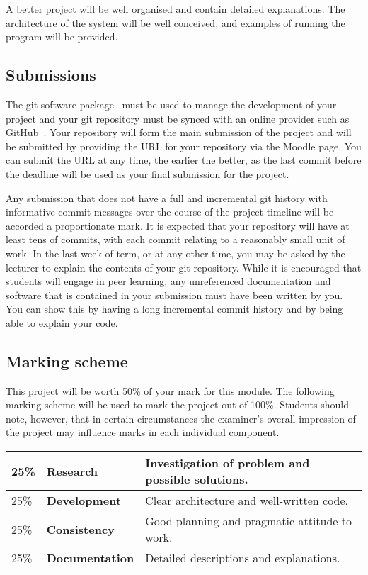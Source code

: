 \documentclass[12pt, a4paper]{article}
\begin{document}
A better project will be well organised and contain detailed explanations.
The architecture of the system will be well conceived, and examples of running the program will be provided.


\subsection*{Submissions}
The git software package~\cite{git} must be used to manage the development of your project and your git repository must be synced with an online provider such as GitHub~\cite{github}.
Your repository will form the main submission of the project and will be submitted by providing the URL for your repository via the Moodle page.
You can submit the URL at any time, the earlier the better, as the last commit before the deadline will be used as your final submission for the project.

Any submission that does not have a full and incremental git history with informative commit messages over the course of the project timeline will be accorded a proportionate mark.
It is expected that your repository will have at least tens of commits, with each commit relating to a reasonably small unit of work.
In the last week of term, or at any other time, you may be asked by the lecturer to explain the contents of your git repository.
While it is encouraged that students will engage in peer learning, any unreferenced documentation and software that is contained in your submission must have been written by you.
You can show this by having a long incremental commit history and by being able to explain your code.

\subsection*{}

\subsection*{Marking scheme}
This project will be worth 50\% of your mark for this module.
The following marking scheme will be used to mark the project out of 100\%.
Students should note, however, that in certain circumstances the examiner's overall impression of the project may influence marks in each individual component.

\begin{center}
  \begin{tabular}{llp{8.4cm}}
    \toprule
    25\% & \textbf{Research} & Investigation of problem and possible solutions. \\
    \midrule
    25\% & \textbf{Development} & Clear architecture and well-written code. \\
    \midrule
    25\% & \textbf{Consistency} & Good planning and pragmatic attitude to work. \\
    \midrule
    25\% & \textbf{Documentation} & Detailed descriptions and explanations. \\
    \bottomrule
  \end{tabular}
\end{center}
\end{document}
